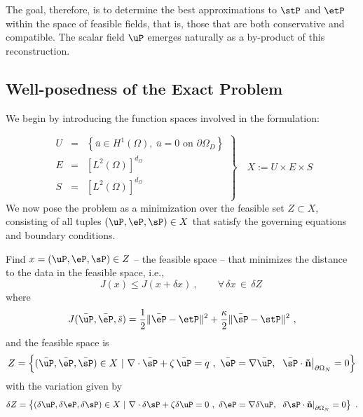The goal, therefore, is to determine the best approximations to $\stP$ and $\etP$ within the space of feasible fields, that is, those that are both conservative and compatible. The scalar field $\uP$ emerges naturally as a by-product of this reconstruction.

\subsection{Well-posedness of the Exact Problem}

We begin by introducing the function spaces involved in the formulation:

\begin{equation}
	\left.
	\begin{array}{rcl}
		U & = & \left\{ \bar{u} \in H^1(\Omega),\ \bar{u} = 0 \text{ on } \partial\Omega_D \right\} \\
		E & = & \left[ L^2(\Omega) \right]^{d_\Omega} \\
		S & = & \left[ L^2(\Omega) \right]^{d_\Omega} \\
	\end{array}
	\right \rbrace  \quad X := U \times E \times S
\end{equation}
We now pose the problem as a minimization over the feasible set $ Z \subset X $, consisting of all tuples $ (\uP, \eP, \sP) \in X $ that satisfy the governing equations and boundary conditions.
\begin{tcolorbox}[colback=black!10!white, halign = justify, boxrule=0pt]
\begin{problem*}[P1]
	Find $x= \left (\uP,\eP,\sP \right) \in Z$ -- the feasible space -- that minimizes the distance to the data in the feasible space, i.e.,
	\begin{equation}
		J(x) \leq J(x+\delta x)~,\qquad \forall \,\delta x\,\in\,\delta Z~
	\end{equation}
	where 
	\begin{equation}
		J(\bar{\uP},\bar{\eP},\bar{s})=\frac12 \|\bar{\eP}-\etP\|^2 + \frac{\kappa}{2} \|\bar{\sP}-\stP\|^2~,
	\end{equation}
	and the feasible space is
	\begin{equation}
		Z=\left \{ (\bar{\uP},\bar{\eP},\bar{\sP})\in X~|~\nabla \cdot \bar{\sP} + \zeta \,\bar{\uP} = q~,~\bar{\eP}=\nabla \bar{\uP},\,\left.~\bar{\sP}\cdot\mathbf{\check{n}}\right |_{\partial \Omega_N}=0 \right \}
	\end{equation}
	with the variation given by
	\begin{equation}
		\delta Z=\left \{ (\delta{\uP},\delta{\eP},\delta{\sP})\in X~|~\nabla \cdot \delta{\sP} + \zeta \delta{\uP} = 0~,~ \delta{\eP}=\nabla \delta{\uP} ,\,\left. ~\delta{\sP}\cdot\mathbf{\check{n}}\right |_{\partial \Omega_N}=0\right \}~.
	\end{equation}
\end{problem*}
\end{tcolorbox}

